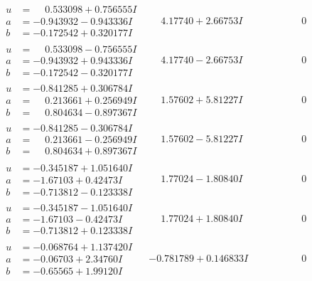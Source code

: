 \documentclass[1p]{elsarticle_modified}
\theoremstyle{definition}
\begin{document}
$$\begin{array}{c|c|c}
\begin{aligned}
u &= \phantom{-}0.533098 + 0.756555 I \\
a &= -0.943932 - 0.943336 I \\
b &= -0.172542 + 0.320177 I\end{aligned}
 & \phantom{-}4.17740 + 2.66753 I & \phantom{-0.000000 } 0 \\ \hline\begin{aligned}
u &= \phantom{-}0.533098 - 0.756555 I \\
a &= -0.943932 + 0.943336 I \\
b &= -0.172542 - 0.320177 I\end{aligned}
 & \phantom{-}4.17740 - 2.66753 I & \phantom{-0.000000 } 0 \\ \hline\begin{aligned}
u &= -0.841285 + 0.306784 I \\
a &= \phantom{-}0.213661 + 0.256949 I \\
b &= \phantom{-}0.804634 - 0.897367 I\end{aligned}
 & \phantom{-}1.57602 + 5.81227 I & \phantom{-0.000000 } 0 \\ \hline\begin{aligned}
u &= -0.841285 - 0.306784 I \\
a &= \phantom{-}0.213661 - 0.256949 I \\
b &= \phantom{-}0.804634 + 0.897367 I\end{aligned}
 & \phantom{-}1.57602 - 5.81227 I & \phantom{-0.000000 } 0 \\ \hline\begin{aligned}
u &= -0.345187 + 1.051640 I \\
a &= -1.67103 + 0.42473 I \\
b &= -0.713812 - 0.123338 I\end{aligned}
 & \phantom{-}1.77024 - 1.80840 I & \phantom{-0.000000 } 0 \\ \hline\begin{aligned}
u &= -0.345187 - 1.051640 I \\
a &= -1.67103 - 0.42473 I \\
b &= -0.713812 + 0.123338 I\end{aligned}
 & \phantom{-}1.77024 + 1.80840 I & \phantom{-0.000000 } 0 \\ \hline\begin{aligned}
u &= -0.068764 + 1.137420 I \\
a &= -0.06703 + 2.34760 I \\
b &= -0.65565 + 1.99120 I\end{aligned}
 & -0.781789 + 0.146833 I & \phantom{-0.000000 } 0 \\ \hline\begin{aligned}

\end{aligned}
\end{array}$$
\end{document}
